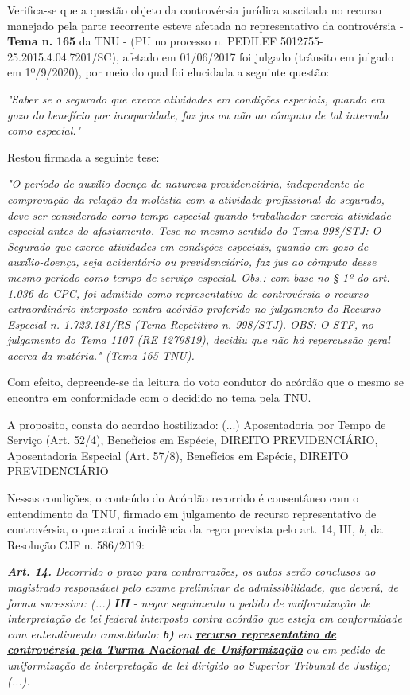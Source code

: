 \documentclass[12pt]{article}
\begin{document}
\justifying
\noindent Verifica-se que a questão objeto da controvérsia jurídica suscitada no recurso manejado pela parte recorrente esteve afetada no representativo da controvérsia - \textbf{Tema n. }\textbf{165} da TNU - (PU no processo n. PEDILEF 5012755-25.2015.4.04.7201/SC),  afetado em 01/06/2017 foi julgado (trânsito em julgado em 1º/9/2020), por meio do qual foi elucidada a seguinte questão:

\noindent \textit{"Saber se o segurado que exerce atividades em condições especiais, quando em gozo do benefício por incapacidade, faz jus ou não ao cômputo de tal intervalo como especial."}

\noindent Restou firmada a seguinte tese:

\noindent \textit{"O período de auxílio-doença de natureza previdenciária, independente de comprovação da relação da moléstia com a atividade profissional do segurado, deve ser considerado como tempo especial quando trabalhador exercia atividade especial antes do afastamento. Tese no mesmo sentido do Tema 998/STJ: O Segurado que exerce atividades em condições especiais, quando em gozo de auxílio-doença, seja acidentário ou previdenciário, faz jus ao cômputo desse mesmo período como tempo de serviço especial. Obs.: com base no § 1º do art. 1.036 do CPC, foi admitido como representativo de controvérsia o recurso extraordinário interposto contra acórdão proferido no julgamento do Recurso Especial n. 1.723.181/RS (Tema Repetitivo n. 998/STJ). OBS: O STF, no julgamento do Tema 1107 (RE 1279819), decidiu que não há repercussão geral acerca da matéria." (Tema 165 TNU).}

\noindent Com efeito, depreende-se da leitura do voto condutor do acórdão que o mesmo se encontra em conformidade com o decidido no  tema pela TNU.

\noindent A proposito, consta do acordao hostilizado: (...) Aposentadoria por Tempo de Serviço (Art. 52/4), Benefícios em Espécie, DIREITO PREVIDENCIÁRIO, Aposentadoria Especial (Art. 57/8), Benefícios em Espécie, DIREITO PREVIDENCIÁRIO

\noindent Nessas condições, o conteúdo do Acórdão recorrido é consentâneo com o entendimento da TNU, firmado em julgamento de recurso representativo de controvérsia, o que atrai a incidência da regra prevista pelo art. 14, III, \textit{b,} da Resolução CJF n. 586/2019:

\noindent \textit{\textbf{Art. 14.}}\textit{ Decorrido o prazo para contrarrazões, os autos serão conclusos ao magistrado responsável pelo exame preliminar de admissibilidade, que deverá, de forma sucessiva: (...) }\textit{\textbf{III }}\textit{- negar seguimento a pedido de uniformização de interpretação de lei federal interposto contra acórdão que esteja em conformidade com entendimento consolidado: }\textit{\textbf{b)}}\textit{ em }\uline{\textit{\textbf{recurso representativo de controvérsia pela Turma Nacional de Uniformização}}}\textit{ ou em pedido de uniformização de interpretação de lei dirigido ao Superior Tribunal de Justiça;(...).}
\end{document}
